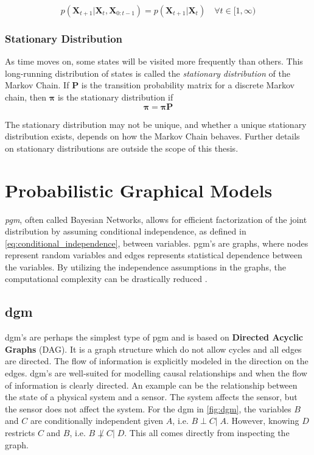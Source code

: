 \begin{equation}\label{eq:theory_markov_property}
p(\mathbf{X}_{t+1} | \mathbf{X}_t,  \mathbf{X}_{0:t-1}) = p(\mathbf{X}_{t+1} | \mathbf{X}_t)  \quad \forall t \in [1, \infty)
\end{equation}

\subsubsection{Stationary Distribution}
As time moves on, some states will be visited more frequently than others. This long-running distribution of states is called the \textit{stationary distribution} of the Markov Chain. If $\mathbf{P}$ is the transition probability matrix for a discrete Markov chain, then $\boldsymbol{\pi}$ is the stationary distribution if 
\begin{equation}
    \boldsymbol{\pi} = \boldsymbol{\pi} \mathbf{P}
\end{equation}

The stationary distribution may not be unique, and whether a unique stationary distribution exists, depends on how the Markov Chain behaves. Further details on stationary distributions are outside the scope of this thesis. 



\section{Probabilistic Graphical Models}
\textit{\acrfull{pgm}}, often called Bayesian Networks, allows for efficient factorization of the joint distribution by assuming conditional independence, as defined in \cref{eq:conditional_independence}, between variables. \acrshort{pgm}'s are graphs, where nodes represent random variables and edges represents statistical dependence between the variables. By utilizing the independence assumptions in the graphs, the computational complexity can be drastically reduced \cite{murphy}.

\subsection{\acrfull{dgm}}
\acrshort{dgm}'s are perhaps the simplest type of \acrshort{pgm} and is based on \textbf{Directed Acyclic Graphs} (DAG). It is a graph structure which do not allow cycles and all edges are directed. The flow of information is explicitly modeled in the direction on the edges. \acrshort{dgm}'s are well-suited for modelling causal relationships and when the flow of information is clearly directed. An example can be the relationship between the state of a physical system and a sensor. The system affects the sensor, but the sensor does not affect the system. For the \acrshort{dgm} in \cref{fig:dgm}, the variables $B$ and $C$ are conditionally independent given $A$, i.e. $B \perp C | \; A$. However, knowing $D$ restricts $C$ and $B$, i.e. $B \not\perp C | \; D$. This all comes directly from inspecting the graph. 

